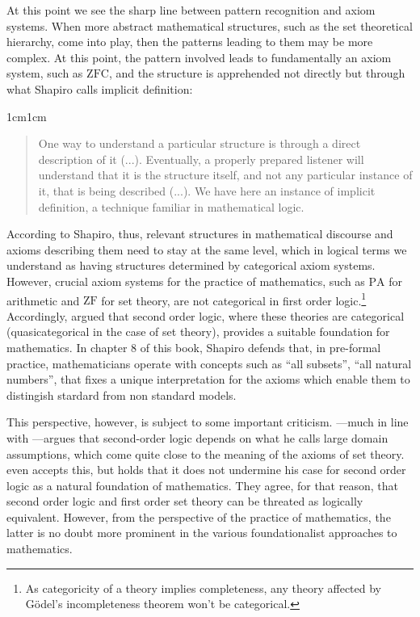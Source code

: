 \documentclass[11pt,a4paper]{book}
\theoremstyle{plain}
\begin{document}
At this point we see the sharp line between pattern recognition and axiom systems. When more abstract mathematical structures, such as the set theoretical hierarchy, come into play, then the patterns leading to them may be more complex. At this point, the pattern involved leads to fundamentally an axiom system, such as $\mathrm{ZFC}$, and the structure is apprehended not directly but through what Shapiro calls implicit definition:

\begin{adjustwidth}{1cm}{1cm}
\begin{quote}
  \small
One way to understand a particular structure is through a direct description of it (...). Eventually, a properly prepared listener will understand that it is the structure itself, and not any particular instance of it, that is being described (...). We have here an instance of implicit definition, a technique familiar in mathematical logic. \parencite[p. 130]{Shapiro1997}
\end{quote}
\end{adjustwidth}

According to Shapiro, thus, relevant structures in mathematical discourse and axioms describing them need to stay at the same level, which in logical terms we understand as having structures determined by categorical axiom systems. However, crucial axiom systems for the practice of mathematics, such as $\mathrm{PA}$ for arithmetic and $\mathrm{ZF}$ for set theory, are not categorical in first order logic.\footnote{As categoricity of a theory implies completeness, any theory affected by Gödel's incompleteness theorem won't be categorical.} Accordingly, \textcite{shapiro1991foundations} argued that second order logic, where these theories are categorical (quasicategorical in the case of set theory), provides a suitable foundation for mathematics. In chapter 8 of this book, Shapiro defends that, in pre-formal practice, mathematicians operate with concepts such as ``all subsets'', ``all natural numbers'', that fixes a unique interpretation for the axioms which enable them to distingish stardard from non standard models.

This perspective, however, is subject to some important criticism. \textcite{Vaananen2015}---much in line with \textcite{Quine1941}---argues that second-order logic depends on what he calls large domain assumptions, which come quite close to the meaning of the axioms of set theory. \textcite{Shapiro2012} even accepts this, but holds that it does not undermine his case for second order logic as a natural foundation of mathematics. They agree, for that reason, that second order logic and first order set theory can be threated as logically equivalent. However, from the perspective of the practice of mathematics, the latter is no doubt more prominent in the various foundationalist approaches to mathematics. 
\end{document}
